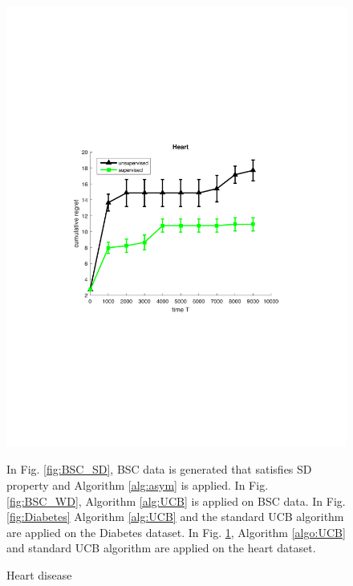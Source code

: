 \begin{figure}[!bt]
\begin{minipage}{4cm}
		\includegraphics[scale=0.3]{../Simulations/Figures/Heart_WD1}
		\label{fig:Heart}
		\vspace{-.5cm}
		\caption{Heart disease}
	\end{minipage}
	\vspace{.2cm}

\noindent
In Fig. \ref{fig:BSC_SD}, BSC data is generated that satisfies SD property and Algorithm \ref{alg:asym} is applied. In  Fig. \ref{fig:BSC_WD}, Algorithm \ref{alg:UCB} is applied on BSC data. In Fig. \ref{fig:Diabetes} Algorithm \ref{alg:UCB} and the standard UCB algorithm are applied on the Diabetes dataset. In Fig. \ref{fig:Heart}, Algorithm \ref{algo:UCB} and standard UCB algorithm are applied on the heart dataset. 
\end{figure}
%
